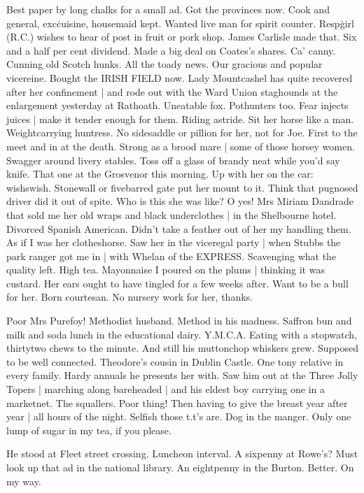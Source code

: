 Best paper by long chalks for a small ad.
Got the provinces now.
Cook and general,
exc\. cuisine,
housemaid kept.
Wanted live man for spirit counter.
Resp\. girl (R.C.) wishes to hear of post in fruit or pork shop.
James Carlisle made that.
Six and a half per cent dividend.
Made a big deal on Coates's shares.
Ca' canny.
Cunning old Scotch hunks.
All the toady news.
Our gracious and popular vicereine.
Bought the IRISH FIELD now.
Lady Mountcashel has quite recovered after her confinement |
and rode out with the Ward Union staghounds at the enlargement yesterday at Rathoath.
Uneatable fox.
Pothunters too.
Fear injects juices |
make it tender enough for them.
Riding astride.
Sit her horse like a man.
Weightcarrying huntress.
No sidesaddle or pillion for her,
not for Joe.
First to the meet and in at the death.
Strong as a brood mare |
some of those horsey women.
Swagger around livery stables.
Toss off a glass of brandy neat while you'd say knife.
That one at the Grosvenor this morning.
Up with her on the car:
wishswish.
Stonewall or fivebarred gate put her mount to it.
Think that pugnosed driver did it out of spite.
Who is this she was like?
O yes!
Mrs Miriam Dandrade that sold me
her old wraps and black underclothes |
in the Shelbourne hotel.
Divorced Spanish American.
Didn't take a feather out of her my handling them.
As if I was her clotheshorse.
Saw her in the viceregal party |
when Stubbs the park ranger got me in |
with Whelan of the EXPRESS.
Scavenging what the quality left.
High tea.
Mayonnaise I poured on the plums |
thinking it was custard.
Her ears ought to have tingled for a few weeks after.
Want to be a bull for her.
Born courtesan.
No nursery work for her, thanks.

Poor Mrs Purefoy!
Methodist husband.
Method in his madness.
Saffron bun and milk and soda lunch in the educational dairy.
Y.M.C.A.
Eating with a stopwatch,
thirtytwo chews to the minute.
And still his muttonchop whiskers grew.
Supposed to be well connected.
Theodore's cousin in Dublin Castle.
One tony relative in every family.
Hardy annuals he presents her with.
Saw him out at the Three Jolly Topers |
marching along bareheaded |
and his eldest boy carrying one in a marketnet.
The squallers.
Poor thing!
Then having to give the breast year after year |
all hours of the night.
Selfish those t.t's are.
Dog in the manger.
Only one lump of sugar in my tea,
if you please.

He stood at Fleet street crossing.
Luncheon interval.
A sixpenny at Rowe's?
Must look up that ad in the national library.
An eightpenny in the Burton.
Better.
On my way.

